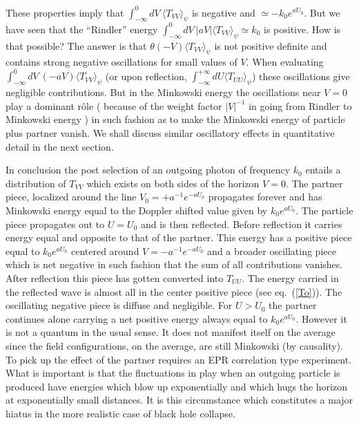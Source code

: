 \documentclass[12pt,oneside]{report}
\begin{document}
These properties imply that $\int_{-\infty}^0\!dV\ 
\langle T_{VV} \rangle_{\psi}$ is negative and $\simeq - k_0
e^{a U_0}$. But we have seen that the ``Rindler'' energy 
$\int_{-\infty}^0\!dV\  \vert a V \vert\langle T_{VV} \rangle_{\psi}\simeq k_0$
 is positive. How is that possible? The answer is that 
$\theta(-V)
\langle T_{VV} \rangle_{\psi}$ is not positive definite and
contains strong negative oscillations for small values of $V$. When
evaluating 
$\int_{-\infty}^0\!dV\ 
(- a V ) \langle T_{VV} \rangle_{\psi}$ (or upon
reflection, $\int_{-\infty}^{+\infty} dU \langle
T_{UU} \rangle_{\psi}$) these oscillations  give   negligible contributions. But
in the Minkowski energy the oscillations near $V=0$ play a dominant
r\^ ole ( because of the weight factor $|V|^{-1}$ in going from Rindler to 
Minkowski energy ) in
such fashion as to make the Minkowski energy of particle plus partner vanish.
We shall discuss similar oscillatory effects in quantitative detail in the
next section.

In conclusion the  post selection of an outgoing photon of
frequency $k_0$ entails a distribution of $T_{VV}$ which
exists on both sides of the horizon $V=0$. The partner
piece, localized around the line $V_0=+ a^{-1} e^{-a U_0}$
propagates forever and has Minkowski energy equal to the
Doppler shifted value given by $k_0e^{a U_0}$. The particle
piece propagates out to $U=U_0$ and is then reflected.
Before reflection it carries energy equal and opposite to
that of the partner. This energy has a positive piece equal
to $k_0e^{aU_0}$ centered around $V=-a^{-1}e^{-a U_0}$ and a
broader oscillating piece which is net negative in such
fashion that the sum of all contributions vanishes. After
reflection this piece has gotten converted into $T_{UU}$. 
The energy carried in
the reflected wave is almost all in the center positive
piece (see eq.~(\ref{To})). The oscillating negative piece is diffuse and
negligible. For $U>U_0$ the partner continues alone
carrying a net positive energy always equal to
$k_0e^{aU_0}$. However it is not a quantum in the usual
sense. It does not manifest itself on the average since the field 
configurations, on the average, are still Minkowski (by causality).
 To pick up the effect of the
partner requires an EPR correlation type experiment.
 What is important is that
the fluctuations in play when an outgoing particle is
produced have energies which blow up exponentially and which
hugs the horizon at exponentially small distances. It is this
circumstance which constitutes a major hiatus in the more
realistic case of black hole collapse.
\end{document}
